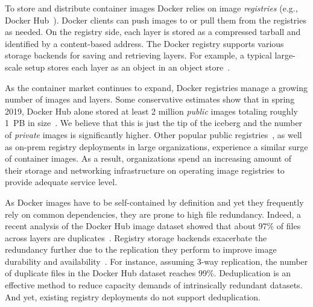 To store and distribute container images Docker relies on image
\emph{registries} (e.g., Docker Hub~\cite{docker-hub}).
%
Docker clients can push images to or pull them from the registries as needed.
%
On the registry side, each layer is stored as a compressed tarball and
identified by a content-based address.
%
The Docker registry supports various storage backends for saving and retrieving
layers. For example, a typical large-scale setup stores each layer as an object in an
object store~\cite{s3,swift}.

As the container market continues to expand, Docker registries manage a
growing number of images and layers.
%
Some conservative estimates show that in spring 2019, Docker Hub alone
stored at least 2 million \emph{public} images totaling roughly 1~PB in
size~\cite{skourtis2019carving,dedupanalysis}. 
%
We believe that this is just the tip of the iceberg and the number of
\emph{private} images is significantly higher.
%
Other popular public
registries~\cite{amazon-ecr,jfrog-artifactory,azure-cr,google-cr}, as well as
on-prem registry deployments in large organizations, experience a similar
surge of container images.
%
As a result,
organizations spend an increasing amount of their storage and networking
infrastructure on operating image registries to provide adequate service level.

%

As Docker images have to be self-contained by definition
and yet they frequently rely on common dependencies,
they are prone to high file redundancy.
%
%
Indeed, a recent analysis of the
Docker Hub image dataset showed that about $97$\% of files across layers are
duplicates~\cite{dedupanalysis}.
%
%
Registry storage backends exacerbate the redundancy further due to the
replication they perform to improve image durability and
availability~\cite{Bonvin:2010:SFS:1807128.1807162}.
%
For instance, assuming 3-way replication, the number of duplicate files in the
Docker Hub dataset reaches 99\%.
%
Deduplication is an effective method to reduce capacity demands of intrinsically redundant
datasets.
%
And yet, existing registry deployments do not support deduplication.

